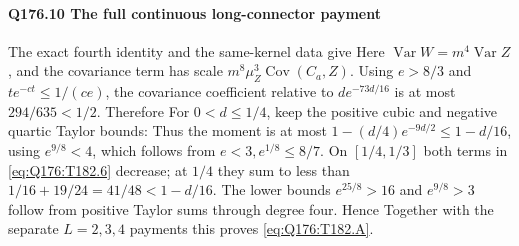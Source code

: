 \paragraph{Q176.10 The full continuous long-connector payment}\label{part:Q176.10}
The exact fourth identity and the same-kernel data give
Here $\operatorname{Var}W=\allowbreak m^4\operatorname{Var}Z$, and the covariance
term has scale $m^8\mu_Z^3\operatorname{Cov}(C_a,\allowbreak Z)$.
Using $e>\allowbreak 8/3$ and $te^{-ct}\le\allowbreak 1/(ce)$, the covariance coefficient
relative to $de^{-73d/16}$ is at most $294/635<\allowbreak 1/2$. Therefore
For $0<\allowbreak d\le\allowbreak 1/4$, keep the positive cubic and negative quartic Taylor bounds:
Thus the moment is at most $1-(d/4)e^{-9d/2}\le\allowbreak 1-d/16$,
using $e^{9/8}<\allowbreak 4$, which follows from $e<\allowbreak 3,\allowbreak e^{1/8}\le\allowbreak 8/7$.
On $[1/4,\allowbreak 1/3]$ both terms in \eqref{eq:Q176:T182.6} decrease;
at $1/4$ they sum to less than $1/16+19/24=\allowbreak 41/48<\allowbreak 1-d/16$.
The lower bounds $e^{25/8}>\allowbreak 16$ and $e^{9/8}>\allowbreak 3$ follow from positive
Taylor sums through degree four. Hence
Together with the separate $L=\allowbreak 2,\allowbreak 3,\allowbreak 4$ payments this proves
\eqref{eq:Q176:T182.A}.

